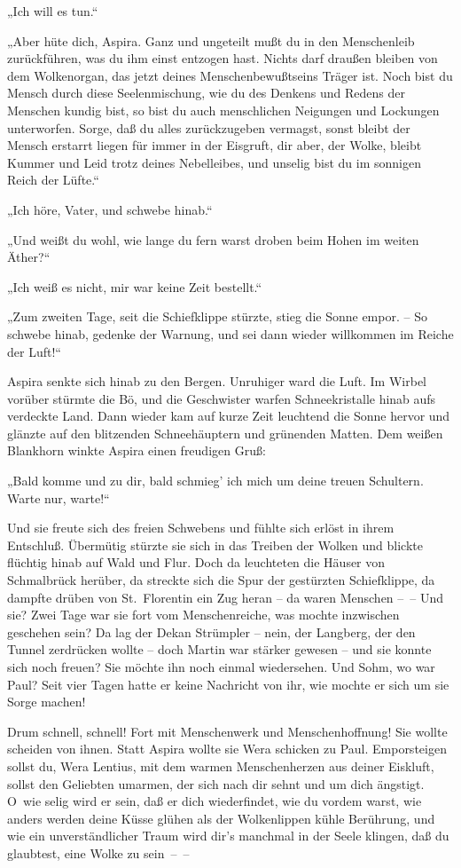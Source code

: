„Ich will es tun.“

„Aber hüte dich, Aspira. Ganz und ungeteilt mußt du in den
Menschenleib zurückführen, was du ihm einst entzogen hast. Nichts
darf draußen bleiben von dem Wolkenorgan, das jetzt deines
Menschenbewußtseins Träger ist. Noch bist du Mensch durch diese
Seelenmischung, wie du des Denkens und Redens der Menschen kundig
bist, so bist du auch menschlichen Neigungen und Lockungen
unterworfen. Sorge, daß du alles zurückzugeben vermagst, sonst
bleibt der Mensch erstarrt liegen für immer in der Eisgruft, dir
aber, der Wolke, bleibt Kummer und Leid trotz deines Nebelleibes,
und unselig bist du im sonnigen Reich der Lüfte.“

„Ich höre, Vater, und schwebe hinab.“

„Und weißt du wohl, wie lange du fern warst droben beim Hohen im
weiten Äther?“

„Ich weiß es nicht, mir war keine Zeit bestellt.“

„Zum zweiten Tage, seit die Schiefklippe stürzte, stieg die Sonne
empor. – So schwebe hinab, gedenke der Warnung, und sei dann wieder
willkommen im Reiche der Luft!“

Aspira senkte sich hinab zu den Bergen. Unruhiger ward die Luft. Im
Wirbel vorüber stürmte die Bö, und die Geschwister warfen
Schneekristalle hinab aufs verdeckte Land. Dann wieder kam auf
kurze Zeit leuchtend die Sonne hervor und glänzte auf den
blitzenden Schneehäuptern und grünenden Matten. Dem weißen
Blankhorn winkte Aspira einen freudigen Gruß:

„Bald komme und zu dir, bald schmieg' ich mich um deine treuen
Schultern. Warte nur, warte!“

Und sie freute sich des freien Schwebens und fühlte sich erlöst in
ihrem Entschluß. Übermütig stürzte sie sich in das Treiben der
Wolken und blickte flüchtig hinab auf Wald und Flur. Doch da
leuchteten die Häuser von Schmalbrück herüber, da streckte sich die
Spur der gestürzten Schiefklippe, da dampfte drüben von
St.~Florentin ein Zug heran – da waren Menschen –~– Und sie? Zwei
Tage war sie fort vom Menschenreiche, was mochte inzwischen
geschehen sein? Da lag der Dekan Strümpler – nein, der Langberg,
der den Tunnel zerdrücken wollte – doch Martin war stärker gewesen
– und sie konnte sich noch freuen? Sie möchte ihn noch einmal
wiedersehen. Und Sohm, wo war Paul? Seit vier Tagen hatte er keine
Nachricht von ihr, wie mochte er sich um sie Sorge machen!

Drum schnell, schnell! Fort mit Menschenwerk und Menschenhoffnung!
Sie wollte scheiden von ihnen. Statt Aspira wollte sie Wera
schicken zu Paul. Emporsteigen sollst du, Wera Lentius, mit dem
warmen Menschenherzen aus deiner Eiskluft, sollst den Geliebten
umarmen, der sich nach dir sehnt und um dich ängstigt. O~wie selig
wird er sein, daß er dich wiederfindet, wie du vordem warst, wie
anders werden deine Küsse glühen als der Wolkenlippen kühle
Berührung, und wie ein unverständlicher Traum wird dir's manchmal
in der Seele klingen, daß du glaubtest, eine Wolke zu sein~–~–


